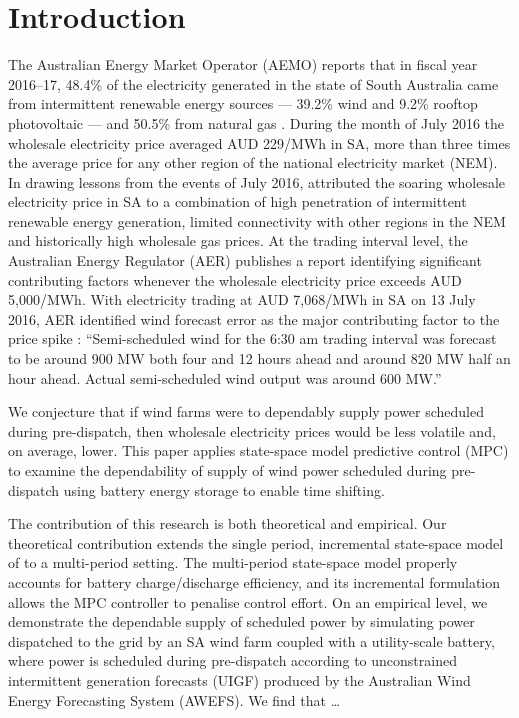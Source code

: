 \documentclass[a4paper, 10pt, twocolumn, preprint, 3p]{elsarticle}
\begin{document}
\section{Introduction}\label{sect:introduction}
The Australian Energy Market Operator (AEMO) reports that in fiscal year 2016--17, 48.4\% of the electricity generated in the state of South Australia came from intermittent renewable energy sources --- 39.2\% wind and 9.2\% rooftop photovoltaic --- and 50.5\% from natural gas \cite{SAER17}.  During the month of July 2016 the wholesale electricity price averaged AUD 229/MWh in SA, more than three times the average price for any other region of the national electricity market (NEM).  In drawing lessons from the events of July 2016, \cite{WB16} attributed the soaring wholesale electricity price in SA to a combination of high penetration of intermittent renewable energy generation, limited connectivity with other regions in the NEM and historically high wholesale gas prices.  At the trading interval level, the Australian Energy Regulator (AER) publishes a report identifying significant contributing factors whenever the wholesale electricity price exceeds AUD 5,000/MWh.  With electricity trading at AUD 7,068/MWh in SA on 13 July 2016, AER identified wind forecast error as the major contributing factor to the price spike \cite{AER16}: ``Semi-scheduled wind for the 6:30 am trading interval was forecast to be around 900 MW both four and 12 hours ahead and around 820 MW half an hour ahead.  Actual semi-scheduled wind output was around 600 MW.''

We conjecture that if wind farms were to dependably supply power scheduled during pre-dispatch, then wholesale electricity prices would be less volatile and, on average, lower.  This paper applies state-space model predictive control (MPC) to examine the dependability of supply of wind power scheduled during pre-dispatch using battery energy storage to enable time shifting.

The contribution of this research is both theoretical and empirical.  Our theoretical contribution extends the single period, incremental state-space model of \cite{TREB16} to a multi-period setting.  The multi-period state-space model properly accounts for battery charge/discharge efficiency, and its incremental formulation allows the MPC controller to penalise control effort.  On an empirical level, we demonstrate the dependable supply of scheduled power by simulating power dispatched to the grid by an SA wind farm coupled with a utility-scale battery, where power is scheduled during pre-dispatch according to unconstrained intermittent generation forecasts (UIGF) produced by the Australian Wind Energy Forecasting System (AWEFS).  We find that \ldots
\end{document}
